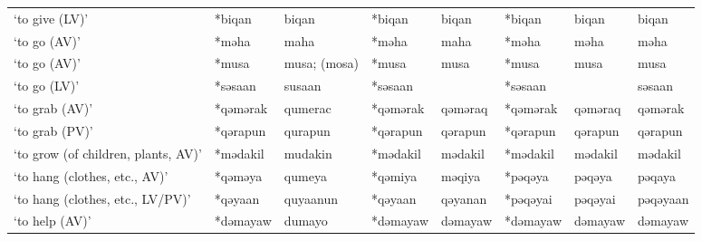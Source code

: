 \begin{landscape}
\begin{longtable}[c]{@{}p{3cm}<{\raggedright}p{2.75cm}<{\raggedright}p{2.75cm}<{\raggedright}p{2.75cm}<{\raggedright}p{2.75cm}<{\raggedright}p{2.75cm}<{\raggedright}p{2.75cm}<{\raggedright}p{2.75cm}<{\raggedright}@{}}
`to give (LV)'                                       & *biqan             & biqan                          & *biqan             & biqan                      & *biqan           & biqan                    & biqan                             \\
`to go (AV)'                                         & *məha              & maha                           & *məha              & maha                       & *məha            & məha                     & məha                              \\
`to go (AV)'                                         & *musa              & musa; (mosa)                   & *musa              & musa                       & *musa            & musa                     & musa                              \\
`to go (LV)'                                         & *səsaan            & susaan                         & *səsaan            &                            & *səsaan          &                          & səsaan                            \\
`to grab (AV)'                                       & *qəmərak           & qumerac                        & *qəmərak           & qəməraq                    & *qəmərak         & qəməraq                  & qəmərak                           \\
`to grab (PV)'                                       & *qərapun           & qurapun                        & *qərapun           & qərapun                    & *qərapun         & qərapun                  & qərapun                           \\
`to grow (of children, plants, AV)'                  & *mədakil           & mudakin                        & *mədakil           & mədakil                    & *mədakil         & mədakil                  & mədakil                           \\
`to hang (clothes, etc., AV)'                        & *qəməya            & qumeya                         & *qəmiya            & məqiya                     & *pəqəya          & pəqəya                   & pəqaya                            \\
`to hang (clothes, etc., LV/PV)'                     & *qəyaan            & quyaanun                       & *qəyaan            & qəyanan                    & *pəqəyai         & pəqəyai                  & pəqəyaan                          \\
`to help (AV)'                                       & *dəmayaw           & dumayo                         & *dəmayaw           & dəmayaw                    & *dəmayaw         & dəmayaw                  & dəmayaw                           \\

\end{longtable}
\end{landscape}
